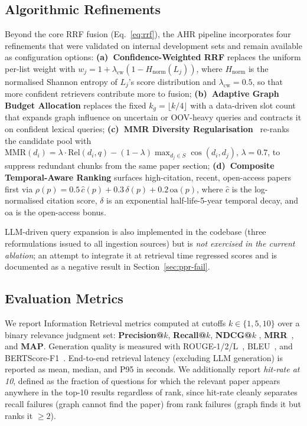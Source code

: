\documentclass[journal]{IEEEtran}
\begin{document}
\subsection{Algorithmic Refinements}
\label{sec:refinements}
Beyond the core RRF fusion (Eq.~\ref{eq:rrf}), the AHR pipeline
incorporates four refinements that were validated on internal
development sets and remain available as configuration options:
\textbf{(a)~Confidence-Weighted RRF} replaces the uniform per-list
weight with $w_j = 1 + \lambda_{\mathrm{cw}}(1-H_{\mathrm{norm}}(L_j))$,
where $H_{\mathrm{norm}}$ is the normalised Shannon entropy of $L_j$'s
score distribution and $\lambda_{\mathrm{cw}}=0.5$, so that more
confident retrievers contribute more to fusion;
\textbf{(b)~Adaptive Graph Budget Allocation} replaces the fixed
$k_g = \lfloor k/4 \rfloor$ with a data-driven slot count that
expands graph influence on uncertain or OOV-heavy queries and
contracts it on confident lexical queries;
\textbf{(c)~MMR Diversity Regularisation}~\cite{carbonell1998mmr}
re-ranks the candidate pool with $\text{MMR}(d_i) = \lambda
\cdot \text{Rel}(d_i,q) - (1-\lambda) \max_{d_j\in S}\cos(d_i,d_j)$,
$\lambda=0.7$, to suppress redundant chunks from the same paper section;
\textbf{(d)~Composite Temporal-Aware Ranking} surfaces high-citation,
recent, open-access papers first via
$\rho(p) = 0.5\,\hat{c}(p) + 0.3\,\delta(p) + 0.2\,\mathrm{oa}(p)$,
where $\hat{c}$ is the log-normalised citation score, $\delta$ is
an exponential half-life-5-year temporal decay, and $\mathrm{oa}$ is
the open-access bonus.

LLM-driven query expansion is also implemented in the codebase
(three reformulations issued to all ingestion sources) but is
\emph{not exercised in the current ablation}; an attempt to integrate
it at retrieval time regressed scores and is documented as a
negative result in Section~\ref{sec:ppr-fail}.

\subsection{Evaluation Metrics}
We report Information Retrieval metrics computed at cutoffs
$k \in \{1, 5, 10\}$ over a binary relevance judgment set:
\textbf{Precision@$k$}, \textbf{Recall@$k$}, \textbf{NDCG@$k$}
\cite{jarvelin2002cumulated}, \textbf{MRR}~\cite{voorhees1999trec},
and \textbf{MAP}. Generation quality is measured with
ROUGE-1/2/L~\cite{lin2004rouge}, BLEU~\cite{papineni2002bleu}, and
BERTScore-F1~\cite{zhang2019bertscore}. End-to-end retrieval latency
(excluding LLM generation) is reported as mean, median, and P95 in
seconds. We additionally report \emph{hit-rate at 10}, defined as the
fraction of questions for which the relevant paper appears anywhere in
the top-10 results regardless of rank, since hit-rate cleanly
separates recall failures (graph cannot find the paper) from rank
failures (graph finds it but ranks it $\geq 2$).
\end{document}
